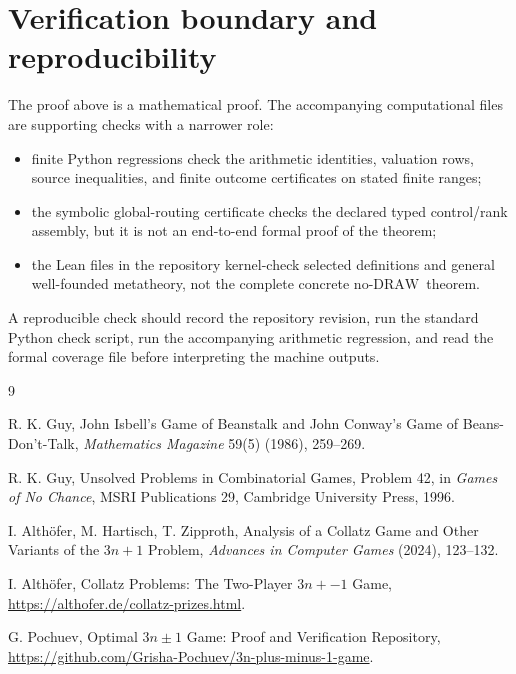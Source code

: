 \documentclass[11pt]{article}
\newcommand{\DRAW}{\ensuremath{\mathrm{DRAW}}}
\begin{document}
\section{Verification boundary and reproducibility}

The proof above is a mathematical proof. The accompanying computational files
are supporting checks with a narrower role:
\begin{itemize}[leftmargin=*]
\item finite Python regressions check the arithmetic identities, valuation rows,
      source inequalities, and finite outcome certificates on stated finite
      ranges;
\item the symbolic global-routing certificate checks the declared typed
      control/rank assembly, but it is not an end-to-end formal proof of the
      theorem;
\item the Lean files in the repository kernel-check selected definitions and
      general well-founded metatheory, not the complete concrete no-\DRAW\
      theorem.
\end{itemize}
A reproducible check should record the repository revision, run the standard
Python check script, run the accompanying arithmetic regression, and read the formal
coverage file before interpreting the machine outputs.

\begin{thebibliography}{9}

R. K. Guy,
John Isbell's Game of Beanstalk and John Conway's Game of Beans-Don't-Talk,
\emph{Mathematics Magazine} 59(5) (1986), 259--269.

R. K. Guy,
Unsolved Problems in Combinatorial Games, Problem 42,
in \emph{Games of No Chance}, MSRI Publications 29, Cambridge University Press,
1996.

I. Alth\"ofer, M. Hartisch, T. Zipproth,
Analysis of a Collatz Game and Other Variants of the $3n+1$ Problem,
\emph{Advances in Computer Games} (2024), 123--132.

I. Alth\"ofer,
Collatz Problems: The Two-Player $3n+-1$ Game,
\url{https://althofer.de/collatz-prizes.html}.

G. Pochuev,
Optimal $3n\pm1$ Game: Proof and Verification Repository,
\url{https://github.com/Grisha-Pochuev/3n-plus-minus-1-game}.

\end{thebibliography}
\end{document}
